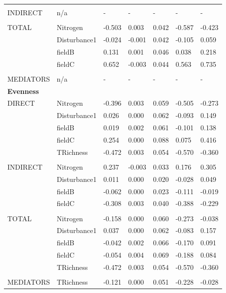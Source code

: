 \begin{longtable}[c]{l l l l l l l }
 & & & & & & \\
 INDIRECT & n/a & - & - & - & - & -\\
 & & & & & & \\
 TOTAL & Nitrogen & -0.503 & 0.003 & 0.042 & -0.587 & -0.423\\
 & Disturbance1 & -0.024 & -0.001 & 0.042 & -0.105 & 0.059\\
 & fieldB & 0.131 & 0.001 & 0.046 & 0.038 & 0.218\\
 & fieldC & 0.652 & -0.003 & 0.044 & 0.563 & 0.735\\
 & & & & & & \\
 MEDIATORS &n/a & - & - & - & - & -\\
\textbf{Evenness} &  &  &  &  &  &\\
\hline
 DIRECT & Nitrogen & -0.396 & 0.003 & 0.059 & -0.505 & -0.273\\
 & Disturbance1 & 0.026 & 0.000 & 0.062 & -0.093 & 0.149\\
 & fieldB & 0.019 & 0.002 & 0.061 & -0.101 & 0.138\\
 & fieldC & 0.254 & 0.000 & 0.088 & 0.075 & 0.416\\
 & TRichness & -0.472 & 0.003 & 0.054 & -0.570 & -0.360\\
 & & & & & & \\
 INDIRECT & Nitrogen & 0.237 & -0.003 & 0.033 & 0.176 & 0.305\\
 & Disturbance1 & 0.011 & 0.000 & 0.020 & -0.028 & 0.049\\
 & fieldB & -0.062 & 0.000 & 0.023 & -0.111 & -0.019\\
 & fieldC & -0.308 & 0.003 & 0.040 & -0.388 & -0.229\\
 & & & & & & \\
 TOTAL & Nitrogen & -0.158 & 0.000 & 0.060 & -0.273 & -0.038\\
 & Disturbance1 & 0.037 & 0.000 & 0.062 & -0.083 & 0.157\\
 & fieldB & -0.042 & 0.002 & 0.066 & -0.170 & 0.091\\
 & fieldC & -0.054 & 0.004 & 0.069 & -0.188 & 0.084\\
 & TRichness & -0.472 & 0.003 & 0.054 & -0.570 & -0.360\\
 & & & & & & \\
 MEDIATORS &TRichness & -0.121 & 0.000 & 0.051 & -0.228 & -0.028\\
\end{longtable}
